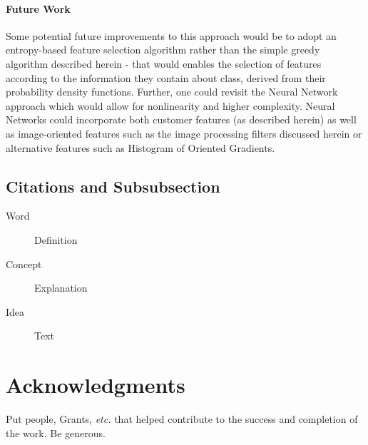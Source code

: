 \documentclass[fleqn,10pt]{SelfArx} %
\begin{document}
\paragraph{Future Work}
Some potential future improvements to this approach would be to adopt an entropy-based feature selection algorithm rather than the simple greedy algorithm described herein - that would enables the selection of features according to the information they contain about class, derived from their probability density functions.  Further, one could revisit the Neural Network approach which would allow for nonlinearity and higher complexity.  Neural Networks could incorporate both customer features (as described herein) as well as image-oriented features such as the image processing filters discussed herein or alternative features such as Histogram of Oriented Gradients.

\subsection{Citations and Subsubsection}

\begin{description}
\item[Word] Definition
\item[Concept] Explanation
\item[Idea] Text
\end{description}

\section*{Acknowledgments} %
Put people, Grants, \textit{etc.} that helped contribute to the success and completion of the work.  Be generous.






\end{document}
